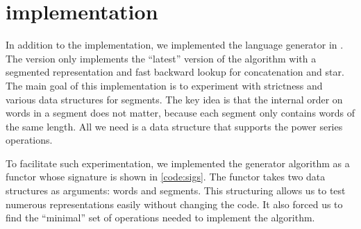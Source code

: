 \section{\ocaml implementation}
\label{sec:ocaml}

\lstset{language=[Objective]Caml}

In addition to the \haskell implementation, we implemented the language generator
in \ocaml.
The \ocaml version only implements the ``latest'' version of the
algorithm with a segmented representation and fast backward lookup for concatenation and star.
The main goal of this implementation is to experiment with strictness
and various data structures for segments. 
The key idea is that the internal order on words in a segment does not matter,
because each segment only contains words of the same length.
All we need is a data structure that supports the power series
operations.

To facilitate such experimentation, we implemented the generator
algorithm as a functor whose signature is shown in \autoref{code:sigs}.
The functor takes two data structures as arguments: words and segments.
This structuring allows us to test numerous representations easily without changing
the code. It also forced us to find the ``minimal'' set of operations
needed to implement the algorithm.

